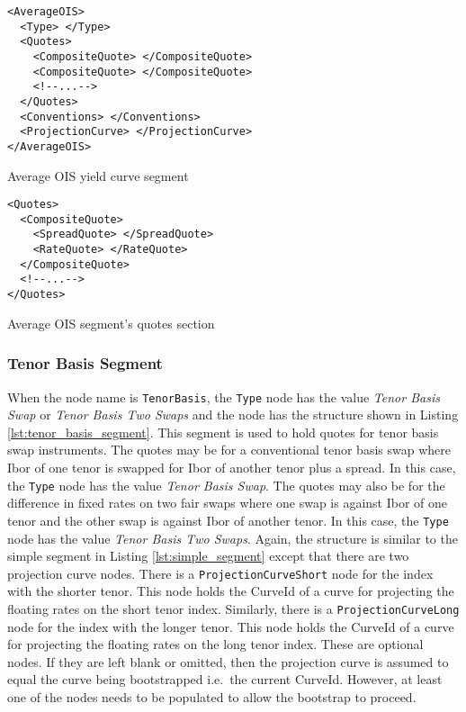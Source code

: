 \begin{listing}[H]
\begin{verbatim}
<AverageOIS>
  <Type> </Type>
  <Quotes>
    <CompositeQuote> </CompositeQuote>
    <CompositeQuote> </CompositeQuote>
    <!--...-->
  </Quotes>
  <Conventions> </Conventions>
  <ProjectionCurve> </ProjectionCurve>
</AverageOIS>
\end{verbatim}
\caption{Average OIS yield curve segment}
\label{lst:average_ois_segment}
\end{listing}

\begin{listing}[H]
\begin{verbatim}
<Quotes>
  <CompositeQuote>
    <SpreadQuote> </SpreadQuote>
    <RateQuote> </RateQuote>
  </CompositeQuote>
  <!--...-->
</Quotes>
\end{verbatim}
\caption{Average OIS segment's quotes section}
\label{lst:average_ois_quotes}
\end{listing}

\subsubsection*{Tenor Basis Segment}
When the node name is \lstinline!TenorBasis!, the \lstinline!Type! node has the value \emph{Tenor Basis Swap} or 
\emph{Tenor Basis Two Swaps} and the node has the structure shown in Listing \ref{lst:tenor_basis_segment}. This segment 
is used to hold quotes for tenor basis swap instruments. The quotes may be for a conventional tenor basis swap where Ibor 
of one tenor is swapped for Ibor of another tenor plus a spread. In this case, the \lstinline!Type! node has the value 
\emph{Tenor Basis Swap}. The quotes may also  be for the difference in fixed rates on two fair swaps where one swap is against 
Ibor of one tenor and the other swap is against Ibor of another tenor. In this case, the \lstinline!Type! node has the 
value \emph{Tenor Basis Two Swaps}. Again, the structure is similar to the simple segment in Listing 
\ref{lst:simple_segment} except that there are two projection curve nodes. There is a \lstinline!ProjectionCurveShort! 
node for the index with the shorter tenor. This node holds the CurveId of a curve for projecting the floating rates on the 
short tenor index. Similarly, there is a \lstinline!ProjectionCurveLong! node for the index with the longer tenor. This 
node holds the CurveId of a curve for projecting the floating rates on the long tenor index. These are optional nodes. If 
they are left blank or omitted, then the projection curve is assumed to equal the curve being bootstrapped i.e.\ the 
current CurveId. However, at least one of the nodes needs to be populated to allow the bootstrap to proceed.


